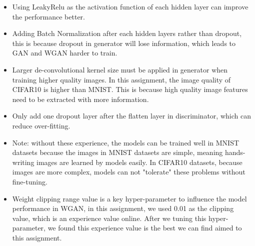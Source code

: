 \documentclass[12pt,letterpaper]{article}
\begin{document}
\begin{itemize}
    \item Using LeakyRelu as the activation function of each hidden layer can improve the performance better.
    \item Adding Batch Normalization after each hidden layers rather than dropout, this is because dropout in generator will lose information, which leads to GAN and WGAN harder to train.
    \item Larger de-convolutional kernel size must be applied in generator when training higher quality images. In this assignment, the image quality of CIFAR10 is higher than MNIST. This is because high quality image features need to be extracted with more information.
    \item Only add one dropout layer after the flatten layer in discriminator, which can reduce over-fitting.
    \item Note: without these experience, the models can be trained well in MNIST datasets because the images in MNIST datasets are simple, meaning hands-writing images are learned by models easily. In CIFAR10 datasets, because images are more complex, models can not "tolerate" these problems without fine-tuning.
    \item Weight clipping range value is a key hyper-parameter to influence the model performance in WGAN, in this assignment, we used 0.01 as the clipping value, which is an experience value online. After we tuning this hyper-parameter, we found this experience value is the best we can find aimed to this assignment.
\end{itemize}
\end{document}
